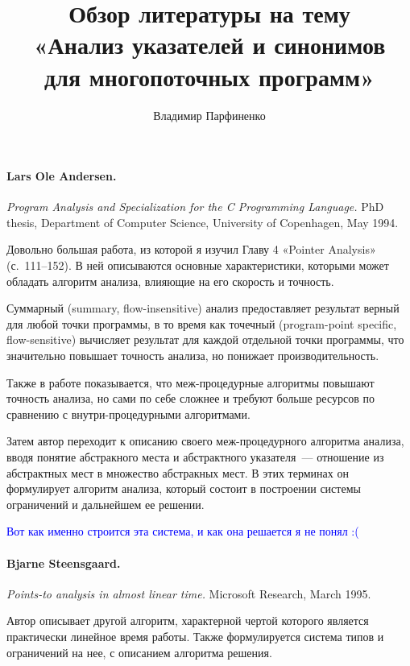 \documentclass[12pt]{article}
\title{
  Обзор литературы на тему \\
  «Анализ указателей и синонимов\\ для многопоточных программ»
}
\author{
  Владимир Парфиненко
}
\newcommand{\remark}[1]{\textcolor{blue}{#1}}
\newcommand{\eng}[1]{{\English#1}}
\begin{document}
  \maketitle

    \paragraph{Lars Ole Andersen.}
      \eng{
        \textit{Program Analysis and Specialization for
          the C Programming Language.}
        PhD thesis, Department of Computer Science, University of Copenhagen,
        May 1994.
      }

      Довольно большая работа, из которой я изучил Главу 4 «Pointer Analysis»
      (с.~111--152). В ней описываются основные характеристики, которыми
      может обладать алгоритм анализа, влияющие на его скорость и точность.

      Суммарный (\eng{summary, flow-insensitive}) анализ предоставляет
      результат верный для любой точки программы, в то время как точечный
      (\eng{program-point specific, flow-sensitive}) вычисляет результат
      для каждой отдельной точки программы, что значительно повышает точность
      анализа, но понижает производительность.

      Также в работе показывается, что меж-процедурные алгоритмы повышают
      точность анализа, но сами по себе сложнее и требуют больше ресурсов по
      сравнению с внутри-процедурными алгоритмами.

      Затем автор переходит к описанию своего меж-процедурного
      алгоритма анализа, вводя понятие абстракного места и
      абстрактного указателя~--- отношение из абстрактных мест в множество
      абстракных мест. В этих терминах он формулирует алгоритм анализа, который
      состоит в построении системы ограничений и дальнейшем ее решении.

      \remark{Вот как именно строится эта система, и как она решается я
      не понял :(}


    \paragraph{Bjarne Steensgaard.}
      \eng{
        \textit{Points-to analysis in almost linear time.}
        Microsoft Research,
        March 1995.
      }

      Автор описывает другой алгоритм, характерной чертой которого является
      практически линейное время работы. Также формулируется система типов
      и ограничений на нее, с описанием алгоритма решения.
\end{document}
